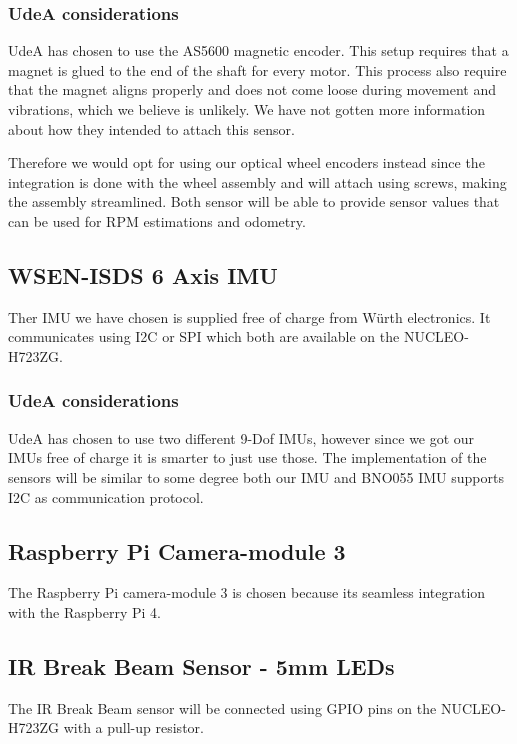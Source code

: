 \documentclass[a4paper,8pt]{article}
\begin{document}
  \subsubsection{UdeA considerations}

  UdeA has chosen to use the AS5600 magnetic encoder. This setup requires that a magnet is glued to the end of the shaft for every motor. This process also require that the magnet aligns properly and does not come loose during movement and vibrations, which we believe is unlikely. We have not gotten more information about how they intended to attach this sensor.

  Therefore we would opt for using our optical wheel encoders instead since the integration is done with the wheel assembly and will attach using screws, making the assembly streamlined. Both sensor will be able to provide sensor values that can be used for RPM estimations and odometry.

  \subsection{WSEN-ISDS 6 Axis IMU}

  Ther IMU we have chosen is supplied free of charge from Würth
  electronics. It communicates using I2C or SPI which both are available
  on the NUCLEO-H723ZG.

  \subsubsection{UdeA considerations}

  UdeA has chosen to use two different 9-Dof IMUs, however since we got our IMUs free of charge it is smarter to just use those. The implementation of the sensors will be similar to some degree both our IMU and BNO055 IMU supports I2C as communication protocol.

  \subsection{Raspberry Pi Camera-module 3}

  The Raspberry Pi camera-module 3 is chosen because its seamless
  integration with the Raspberry Pi 4.

  \subsection{IR Break Beam Sensor - 5mm LEDs}

  The IR Break Beam sensor will be connected using GPIO pins on the
  NUCLEO-H723ZG with a pull-up resistor.
\end{document}
